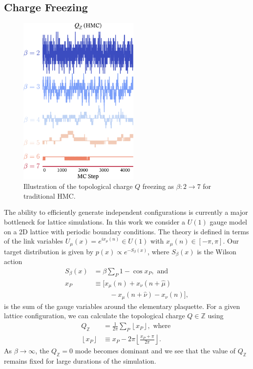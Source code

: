 \documentclass[a4paper,11pt]{article}
\begin{document}
\subsection{\label{subsec:qfreezing}Charge Freezing}
%
\begin{figure}
    \vspace{-\baselineskip}
    \centering
    \includegraphics[width=0.53\textwidth]{assets/qfreezing.pdf}
    \caption{\label{fig:qfreezing}Illustration of the topological charge \(Q\)
    freezing as \(\beta : 2 \rightarrow 7\) for traditional HMC.}
\end{figure}
%
The ability to efficiently generate independent configurations is currently
a major bottleneck for lattice simulations.
%
In this work we consider a \(U(1)\) gauge model on a 2D lattice with periodic
boundary conditions.
%
The theory is defined in terms of the link variables \(U_{\mu}(x) = e^{i
x_{\mu}(n)} \in U(1)\) with \(x_{\mu}(n) \in [-\pi, \pi]\).
%
Our target distribution is given by \(p(x)\propto e^{-S_{\beta}(x)}\), where
\(S_{\beta}(x)\) is the Wilson action
%
\begin{align}
    S_{\beta}(x) &= \beta \sum_{P} 1 - \cos{x_{P}}, \text{ and}\\
    x_{P} &\equiv \big[x_{\mu}(n) + x_{\nu}(n + \hat{\mu})\nonumber \\
          &\quad\quad\,\, - x_{\mu}(n+\hat{\nu}) - x_{\nu}(n)\big],\nonumber
\end{align}
%
is the sum of the gauge variables around the elementary plaquette.
%
For a given lattice configuration, we can calculate the topological charge \(Q
\in \mathbb{Z}\) using
%
\begin{align*}
    Q_{\mathbb{Z}} &= \frac{1}{2\pi}\sum_{P}\left\lfloor x_{P} \right\rfloor,\text{ where } \\
    \left\lfloor x_{P} \right\rfloor &\equiv x_{P} - 2\pi
    \left\lfloor\frac{x_{P}+\pi}{2\pi}\right\rfloor.
\end{align*}
%
As \(\beta \rightarrow \infty\), the \(Q_{\mathbb{Z}} = 0\) mode becomes
dominant and we see that the value of \(Q_\mathbb{Z}\) remains fixed for large
durations of the simulation.
%
\end{document}
